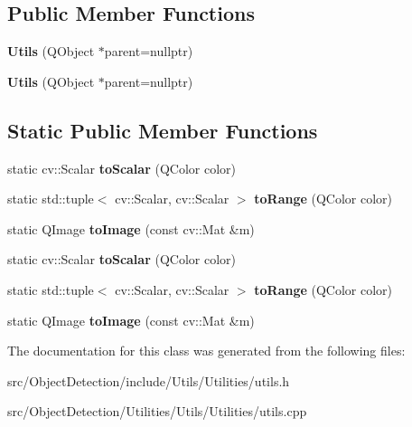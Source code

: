 \subsection*{Public Member Functions}
\begin{DoxyCompactItemize}
\item 
\mbox{\label{class_utilities_1_1_utils_a2485caf868a56ee5a1f6052193fd722c}} 
{\bfseries Utils} (Q\+Object $\ast$parent=nullptr)
\item 
\mbox{\label{class_utilities_1_1_utils_a3fb7a4bb421a542231d35e7b13b23c09}} 
{\bfseries Utils} (Q\+Object $\ast$parent=nullptr)
\end{DoxyCompactItemize}
\subsection*{Static Public Member Functions}
\begin{DoxyCompactItemize}
\item 
\mbox{\label{class_utilities_1_1_utils_a3e2dc24f6e8bffb572a968015f070e3d}} 
static cv\+::\+Scalar {\bfseries to\+Scalar} (Q\+Color color)
\item 
\mbox{\label{class_utilities_1_1_utils_a8049b798a16e83ac705fa3cda8340c7e}} 
static std\+::tuple$<$ cv\+::\+Scalar, cv\+::\+Scalar $>$ {\bfseries to\+Range} (Q\+Color color)
\item 
\mbox{\label{class_utilities_1_1_utils_ac8c1bcc2dd3d5bda38d1636bd92e5173}} 
static Q\+Image {\bfseries to\+Image} (const cv\+::\+Mat \&m)
\item 
\mbox{\label{class_utilities_1_1_utils_a8f7d65cb17b3bdafd8596c70a6b845f1}} 
static cv\+::\+Scalar {\bfseries to\+Scalar} (Q\+Color color)
\item 
\mbox{\label{class_utilities_1_1_utils_a7b729accfc80a79a3f73cd815c91a8ed}} 
static std\+::tuple$<$ cv\+::\+Scalar, cv\+::\+Scalar $>$ {\bfseries to\+Range} (Q\+Color color)
\item 
\mbox{\label{class_utilities_1_1_utils_afe3f5eca1bb75b6b5f186760ccceeeb0}} 
static Q\+Image {\bfseries to\+Image} (const cv\+::\+Mat \&m)
\end{DoxyCompactItemize}


The documentation for this class was generated from the following files\+:\begin{DoxyCompactItemize}
\item 
src/\+Object\+Detection/include/\+Utils/\+Utilities/utils.\+h\item 
src/\+Object\+Detection/\+Utilities/\+Utils/\+Utilities/utils.\+cpp\end{DoxyCompactItemize}
